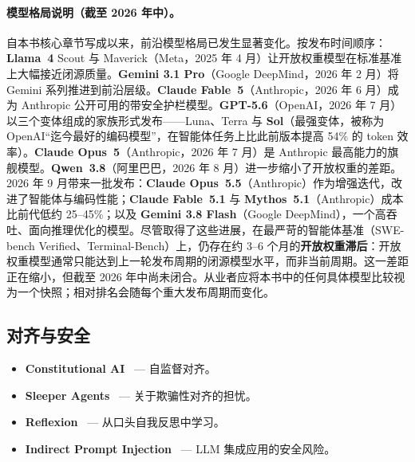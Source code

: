 \paragraph{模型格局说明（截至 2026 年中）。}
自本书核心章节写成以来，前沿模型格局已发生显著变化。按发布时间顺序：\textbf{Llama~4} Scout 与 Maverick（Meta，2025 年 4 月）让开放权重模型在标准基准上大幅接近闭源质量。\textbf{Gemini 3.1 Pro}（Google DeepMind，2026 年 2 月）将 Gemini 系列推进到前沿层级。\textbf{Claude Fable~5}（Anthropic，2026 年 6 月）成为 Anthropic 公开可用的带安全护栏模型。\textbf{GPT-5.6}（OpenAI，2026 年 7 月）以三个变体组成的家族形式发布——Luna、Terra 与 \textbf{Sol}（最强变体，被称为 OpenAI“迄今最好的编码模型”，在智能体任务上比此前版本提高 54\% 的 token 效率）。\textbf{Claude Opus~5}（Anthropic，2026 年 7 月）是 Anthropic 最高能力的旗舰模型。\textbf{Qwen~3.8}（阿里巴巴，2026 年 8 月）进一步缩小了开放权重的差距。2026 年 9 月带来一批发布：\textbf{Claude Opus~5.5}（Anthropic）作为增强迭代，改进了智能体与编码性能；\textbf{Claude Fable~5.1} 与 \textbf{Mythos~5.1}（Anthropic）成本比前代低约 25--45\%；以及 \textbf{Gemini 3.8 Flash}（Google DeepMind），一个高吞吐、面向推理优化的模型。尽管取得了这些进展，在最严苛的智能体基准（SWE-bench Verified、Terminal-Bench）上，仍存在约 3--6 个月的\textbf{开放权重滞后}：开放权重模型通常只能达到上一轮发布周期的闭源模型水平，而非当前周期。这一差距正在缩小，但截至 2026 年中尚未闭合。从业者应将本书中的任何具体模型比较视为一个快照；相对排名会随每个重大发布周期而变化。

\subsection{对齐与安全}
\label{alignment-and-safety}

\begin{itemize}
  \item \textbf{Constitutional AI}~\cite{bai2022constitutional} --- 自监督对齐。
  \item \textbf{Sleeper Agents}~\cite{hubinger2024sleeper} --- 关于欺骗性对齐的担忧。
  \item \textbf{Reflexion}~\cite{shinn2023reflexion} --- 从口头自我反思中学习。
  \item \textbf{Indirect Prompt Injection}~\cite{greshake2023indirect} --- LLM 集成应用的安全风险。
\end{itemize}


